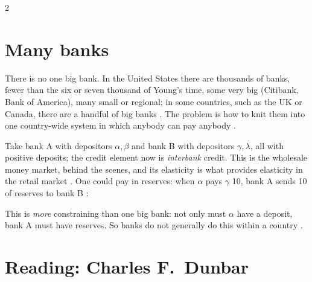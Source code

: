 \begin{paracol}{2}
\section{Many banks}\label{sec:ch-many}

There is no one big bank. In the United States there are thousands of banks, fewer than the six or seven thousand of Young's time, some very
big (Citibank, Bank of America), many small or regional; in some countries, such as the UK or Canada, there are a handful of big banks
. The problem is how to knit them into one country-wide system in which anybody can pay anybody
.

Take bank A with depositors $\alpha,\beta$ and bank B with depositors $\gamma,\lambda$, all with positive deposits; the credit element now
is \emph{interbank} credit. This is the wholesale money market, behind the scenes, and its elasticity is what provides elasticity in the retail
market . One could pay in reserves: when $\alpha$ pays $\gamma$ 10, bank A sends 10 of reserves to
bank B :
\begin{taccts}
\qquad
{}
\end{taccts}
This is \emph{more} constraining than one big bank: not only must $\alpha$ have a deposit, bank A must have reserves. So banks do not
generally do this within a country .

\section{Reading: Charles F.~Dunbar}\label{sec:ch-dunbar}


\end{paracol}
